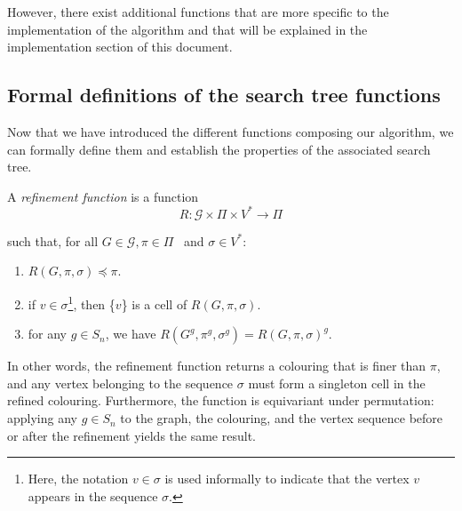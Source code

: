 However, there exist additional functions that are more specific to the implementation of the algorithm and that will be explained in the implementation section of this document.


\subsection{Formal definitions of the search tree functions}

Now that we have introduced the different functions composing our algorithm, we can formally define them and establish the properties of the associated search tree.

\vspace{0.4em}
\begin{definition}\label{def: refinement function}
  A \emph{refinement function} is a function
  \[
  R : \mathcal{G} \times \Pi \times V^* \to \Pi
  \]
  
  
  such that, for all  $G \mathrel{\in}\mathcal{G},  \pi\mathrel{\in}\Pi$ \ and  $\sigma\mathrel{\in}V^*$:
  
  \begin{enumerate}[label=\textit{R\arabic*.}]
    \item\label{RefinementRule:finer}
    $R (G, \pi, \sigma) \preccurlyeq\pi$.
    
    \item\label{RefinementRule:singleton}
     if $v \mathrel{\in}\sigma$\footnote{Here, the notation $v \in \sigma$ is used informally to indicate that the vertex $v$ appears in the sequence $\sigma$.}, then \{$v$\} is a cell of
    $R (G, \pi, \sigma)$.
    
    \item\label{RefinementRule:equivariance}
    for any $g \mathrel{\in} S_n$, we have
    $R (G^g, \pi^g, \sigma^g) = R {(G, \pi, \sigma)}^g$.
\end{enumerate}
\end{definition}

In other words, the refinement function returns a colouring that is finer than $\pi$, and any vertex belonging to the sequence $\sigma$ must form a singleton cell in the refined colouring. Furthermore, the function is equivariant under permutation: applying any $g \in S_n$ to the graph, the colouring, and the vertex sequence before or after the refinement yields the same result.

